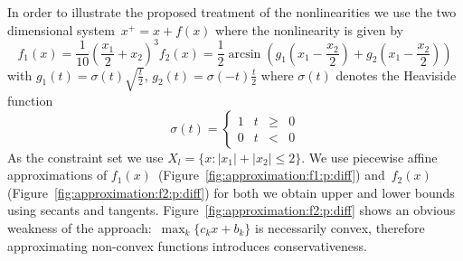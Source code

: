 \documentclass[smallextended]{svjour3}       %
\numberwithin{equation}{section}
\providecommand{\abs}[1]{\left|#1\right|}
\begin{document}
In order to illustrate the proposed treatment of the nonlinearities we use the two dimensional system~$x^+=x+f(x)$ where the nonlinearity is given by
%
\begin{subequations}
\begin{equation}
  f_1(x) = \frac{1}{10}\left(\frac{x_1}{2}+x_2\right)^3
\end{equation}
\begin{equation}
  f_2(x) = \frac{1}{2}\arcsin\left(g_1\left(x_1-\frac{x_2}{2}\right)+g_2\left(x_1-\frac{x_2}{2}\right) \right)
\end{equation}
\end{subequations}
%
with $g_1(t)=\sigma(t)\sqrt{\frac{t}{2}}$, $g_2(t)=\sigma(-t)\frac{t}{2}$ where $\sigma(t)$ denotes the Heaviside function
$$
  \sigma(t) = \left\{\begin{array}{crcl}1& t&\geq&0\\ 0 &t&<&0 \end{array}\right.
$$
%
As the constraint set we use $X_l = \{x:\abs{x_1}+\abs{x_2}\leq 2\}$.
%
We use piecewise affine approximations of $f_1(x)$~(Figure~\ref{fig:approximation:f1:p:diff}) and~$f_2(x)$ (Figure~\ref{fig:approximation:f2:p:diff})
for both we obtain upper and lower bounds using secants and tangents.
%
Figure~\ref{fig:approximation:f2:p:diff} shows an obvious weakness of the approach:~$\max_k\{c_k x+b_k\}$ is necessarily convex, therefore approximating non-convex functions introduces conservativeness.
\end{document}
